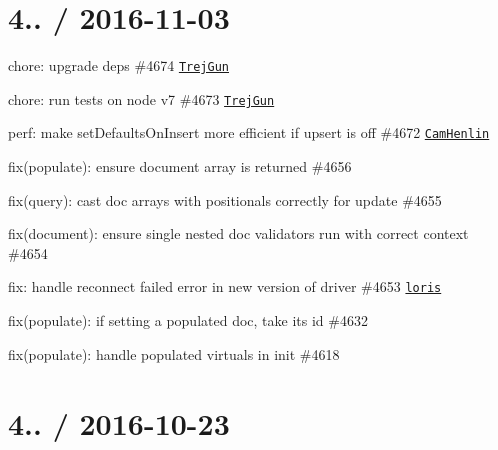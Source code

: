 \section*{4.. / 2016-\/11-\/03 }


\begin{DoxyItemize}
\item chore\+: upgrade deps \#4674 \href{https://github.com/TrejGun}{\tt Trej\+Gun}
\item chore\+: run tests on node v7 \#4673 \href{https://github.com/TrejGun}{\tt Trej\+Gun}
\item perf\+: make set\+Defaults\+On\+Insert more efficient if upsert is off \#4672 \href{https://github.com/CamHenlin}{\tt Cam\+Henlin}
\item fix(populate)\+: ensure document array is returned \#4656
\item fix(query)\+: cast doc arrays with positionals correctly for update \#4655
\item fix(document)\+: ensure single nested doc validators run with correct context \#4654
\item fix\+: handle reconnect failed error in new version of driver \#4653 \href{https://github.com/loris}{\tt loris}
\item fix(populate)\+: if setting a populated doc, take its id \#4632
\item fix(populate)\+: handle populated virtuals in init \#4618
\end{DoxyItemize}

\section*{4.. / 2016-\/10-\/23 }



